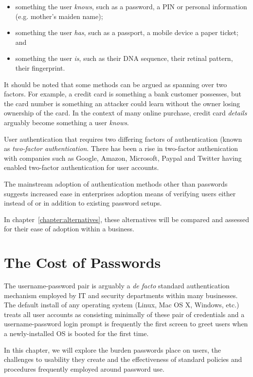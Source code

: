\documentclass{report}
\begin{document}
\begin{itemize}
  \item something the user \emph{knows}, such as a password, a PIN or
    personal information (e.g. mother's maiden name);
  \item something the user \emph{has}, such as a passport, a mobile device
    a paper ticket; and
  \item something the user \emph{is}, such as their DNA sequence,
    their retinal pattern, their fingerprint.
\end{itemize}

It should be noted that some methods can be argued as spanning
over two factors. For example, a credit card is something
a bank customer possesses, but the card number is something
an attacker could learn without the owner losing ownership
of the card. In the context of many online purchase, credit
card \emph{details} arguably become something a user \emph{knows}.

User authentication that requires two differing factors
of authentication (known as \emph{two-factor authentication}. There
has been a rise in two-factor authenication with companies
such as Google, Amazon, Microsoft, Paypal and Twitter having enabled
two-factor authentication for user accounts.

The mainstream adoption of authentication methods other than
passwords suggests increased ease in enterprises adoption means
of verifying users either instead of or in addition to
existing password setups.

In chapter~\ref{chapter:alternatives}, these alternatives will be
compared and assessed for their ease of adoption within a business.

\chapter{The Cost of Passwords}
\label{chapter:costs}

The username-password pair is arguably a \emph{de facto} standard
authentication mechanism employed by IT and security departments
within many businesses. The default install of any operating
system (Linux, Mac OS X, Windows, etc.) treats all user accounts
as consisting minimally of these pair of credentials and a
username-password login prompt is frequently the first
screen to greet users when a newly-installed OS is booted
for the first time.

In this chapter, we will explore the burden passwords place
on users, the challenges to usability they create and
the effectiveness of standard policies and procedures
frequently employed around password use.
\end{document}
